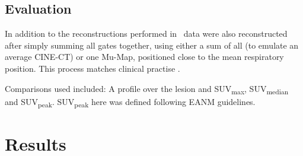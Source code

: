     \vspace{-0.5cm}
    
    \subsection{Evaluation} \label{sec:evaluation}
        
        In addition to the reconstructions performed in~ data were also reconstructed after simply summing all gates together,  using either a sum of all  (to emulate an average CINE-CT) or one \gls{Mu-Map}, positioned  close to the mean respiratory position. This process matches clinical practise . 
        
        Comparisons used included: A profile over the lesion and \gls{SUV}\textsubscript{max}, \gls{SUV}\textsubscript{median} and \gls{SUV}\textsubscript{peak}. \gls{SUV}\textsubscript{peak} here was defined following \gls{EANM} guidelines.%

\vspace{-0.5cm}

\section{Results} \label{sec:results}
    
    
